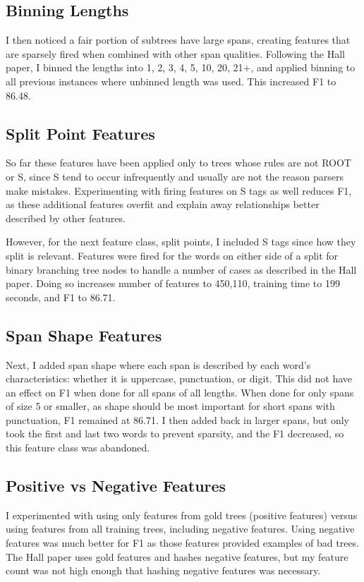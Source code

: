 \documentclass[11pt]{article}
\begin{document}
\subsection{Binning Lengths}
I then noticed a fair portion of subtrees have large spans, creating features that are sparsely
fired when combined with other span qualities. Following the Hall paper, I binned the lengths
into 1, 2, 3, 4, 5, 10, 20, 21+, and applied binning to all previous instances where unbinned
length was used. This increased F1 to 86.48.

\subsection{Split Point Features}
So far these features have been applied only to trees whose rules are not ROOT or S, since
S tend to occur infrequently and usually are not the reason parsers make mistakes. Experimenting
with firing features on S tags as well reduces F1, as these additional features overfit and
explain away relationships better described by other features.

However, for the next feature class, split points, I included S tags since how they split is
relevant. Features were fired for the words on either side of a split for binary branching
tree nodes to handle a number of cases as described in the Hall paper. Doing so increases
number of features to 450,110, training time to 199 seconds, and F1 to 86.71.

\subsection{Span Shape Features}
Next, I added span shape where each span is described by each word's characteristics: whether
it is uppercase, punctuation, or digit. This did not have an effect on F1 when done for all
spans of all lengths. When done for only spans of size 5 or smaller, as shape should be most
important for short spans with punctuation, F1 remained at 86.71. I then added back in larger
spans, but only took the first and last two words to prevent sparsity, and the F1 decreased, so
this feature class was abandoned.

\subsection{Positive vs Negative Features}
I experimented with using only features from gold trees (positive features) 
versus using features from all training trees, including negative features. Using negative 
features was much better for F1 as those features provided examples of bad trees.
The Hall paper uses gold features and hashes negative features, but my feature count was
not high enough that hashing negative features was necessary. 
\end{document}

